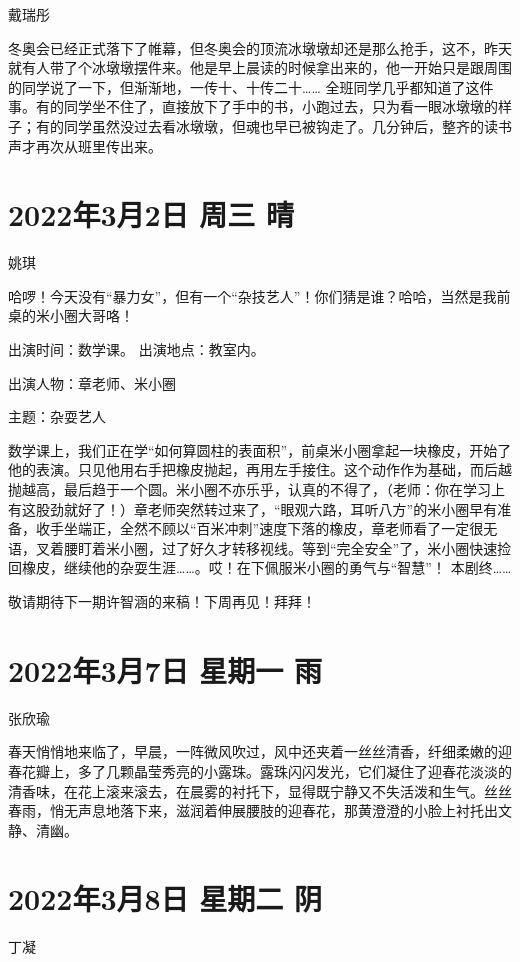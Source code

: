 戴瑞彤

冬奥会已经正式落下了帷幕，但冬奥会的顶流冰墩墩却还是那么抢手，这不，昨天就有人带了个冰墩墩摆件来。他是早上晨读的时候拿出来的，他一开始只是跟周围的同学说了一下，但渐渐地，一传十、十传二十…… 全班同学几乎都知道了这件事。有的同学坐不住了，直接放下了手中的书，小跑过去，只为看一眼冰墩墩的样子；有的同学虽然没过去看冰墩墩，但魂也早已被钩走了。几分钟后，整齐的读书声才再次从班里传出来。

\section{2022年3月2日 周三 晴}

姚琪

哈啰！今天没有“暴力女”，但有一个“杂技艺人”！你们猜是谁？哈哈，当然是我前桌的米小圈大哥咯！

出演时间：数学课。 出演地点：教室内。

出演人物：章老师、米小圈

主题：杂耍艺人

数学课上，我们正在学“如何算圆柱的表面积”，前桌米小圈拿起一块橡皮，开始了他的表演。只见他用右手把橡皮抛起，再用左手接住。这个动作作为基础，而后越抛越高，最后趋于一个圆。米小圈不亦乐乎，认真的不得了，（老师：你在学习上有这股劲就好了！）章老师突然转过来了，“眼观六路，耳听八方”的米小圈早有准备，收手坐端正，全然不顾以“百米冲刺”速度下落的橡皮，章老师看了一定很无语，叉着腰盯着米小圈，过了好久才转移视线。等到“完全安全”了，米小圈快速捡回橡皮，继续他的杂耍生涯……。哎！在下佩服米小圈的勇气与“智慧”！
本剧终……

敬请期待下一期许智涵的来稿！下周再见！拜拜！

\section{2022年3月7日 星期一 雨}

张欣瑜

春天悄悄地来临了，早晨，一阵微风吹过，风中还夹着一丝丝清香，纤细柔嫩的迎春花瓣上，多了几颗晶莹秀亮的小露珠。露珠闪闪发光，它们凝住了迎春花淡淡的清香味，在花上滚来滚去，在晨雾的衬托下，显得既宁静又不失活泼和生气。丝丝春雨，悄无声息地落下来，滋润着伸展腰肢的迎春花，那黄澄澄的小脸上衬托出文静、清幽。

\section{2022年3月8日 星期二 阴}

丁凝

